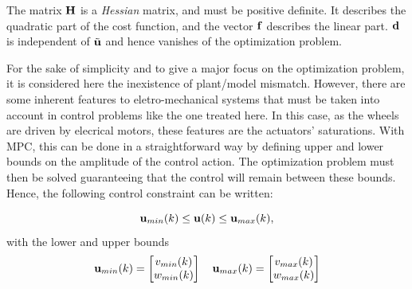 \documentclass[conference]{IEEEtran} %
\begin{document}
The matrix ${\bf H}$ is a {\em Hessian} matrix, and must be positive definite. It describes the quadratic part of the cost function, and the vector ${\bf f}$ describes the linear part. $\bf d$ is independent of $\tilde{\bf u}$ and hence vanishes of the optimization problem.

For the sake of simplicity and to give a major focus on the optimization problem, it is considered here the inexistence of plant/model mismatch. However, there are some inherent features to eletro-mechanical systems that must be taken into account in control problems like the one treated here. In this case, as the wheels are driven by elecrical motors, these features are the actuators' saturations. With MPC, this can be done in a straightforward way by defining upper and lower bounds on the amplitude of the control action. The optimization problem must then be solved guaranteeing that the control will remain between these bounds. Hence, the following control constraint can be written:

\begin{equation}\label{eqn:uconstr}
	{\bf u}_{min}(k) \leq {\bf u}(k) \leq {\bf u}_{max}(k),
\end{equation}
with the lower and upper bounds 
\begin{equation*}
	{\bf u}_{min}(k) = \begin{bmatrix}
		v_{min}(k) \\ w_{min}(k)
	\end{bmatrix} \quad 
	{\bf u}_{max}(k) = \begin{bmatrix}
		v_{max}(k) \\ w_{max}(k)
	\end{bmatrix}
\end{equation*}
\end{document}
